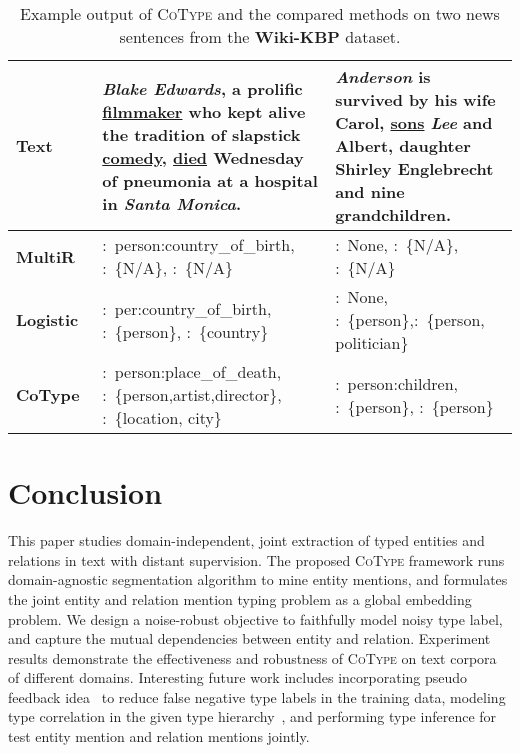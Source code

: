 \documentclass[letterpaper]{sig-alternate-2013}
\begin{document}
\begin{table}[t]
\begin{scriptsize}
\vspace{-0.2cm}
\hspace*{-0.3cm}
\begin{tabularx}{1.05\linewidth}{| m{1.15cm}|X|X|}
\hline
\textbf{Text}
& {\textbf{\textit{Blake Edwards}}, a prolific \underline{filmmaker} who kept alive the tradition of slapstick \underline{comedy}, \underline{died} Wednesday of pneumonia at a hospital in \textbf{\textit{Santa Monica}}.}
& {\textit{\textbf{Anderson}} is survived by his wife Carol, \underline{sons} \textit{\textbf{Lee}} and Albert, daughter Shirley Englebrecht and nine grandchildren.}
\\ \hline
\textbf{MultiR}~\cite{hoffmann2011multiR}
& :~{\color{red!70}person:country\_of\_birth}, :~\{N/A\}, :~\{N/A\}
& :~{\color{red!70}None}, :~\{N/A\}, :~\{N/A\}
\\ \hline
\textbf{Logistic}~\cite{mintz2009distant}
& :~{\color{red!70}per:country\_of\_birth}, :~\{person\}, :~\{{\color{red!70}country}\}
& :~{\color{red!70}None}, :~\{person\},:~\{person, {\color{red!70}politician}\}
\\ \hline
\textbf{CoType}
& :~person:place\_of\_death, :~\{person,artist,director\}, :~\{location, city\}
& :~person:children, :~\{person\}, :~\{person\}
\\ \hline
\end{tabularx}
\vspace{-0.2cm}
\caption{Example output of \textsc{CoType} and the compared methods on two news sentences from the \textbf{Wiki-KBP} dataset.}
\label{table:example_output}
\vspace{-0.2cm}
\end{scriptsize}
\end{table}




\section{Conclusion}
\label{sec:conclusion}
This paper studies domain-independent, joint extraction of typed entities and relations in text with distant supervision. The proposed \textsc{CoType} framework runs domain-agnostic segmentation algorithm to mine entity mentions, and formulates the joint entity and relation mention typing problem as a global embedding problem. We design a noise-robust objective to faithfully model noisy type label, and capture the mutual dependencies between entity and relation. Experiment results demonstrate the effectiveness and robustness of \textsc{CoType} on text corpora of different domains. 
Interesting future work includes incorporating pseudo feedback idea~\cite{xu2013filling} to reduce false negative type labels in the training data, modeling type correlation in the given type hierarchy~\cite{ren2016label}, and performing type inference for test entity mention and relation mentions jointly. 
\end{document}
